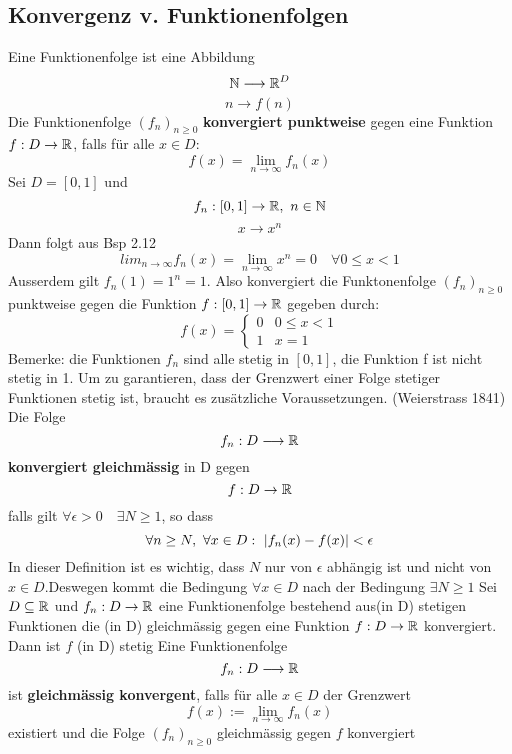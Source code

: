 \subsection{Konvergenz v. Funktionenfolgen}
Eine Funktionenfolge ist eine Abbildung 
\[ \mathbb{N} \longrightarrow \mathbb{R}^D\]
\[ n \longrightarrow f(n)\]
\Def[3.30] Die Funktionenfolge \((f_n)_{n \geq 0}\) \textbf{konvergiert punktweise} gegen eine Funktion \(f: D \rightarrow \mathbb{R}\), falls für alle \(x \in D :\)
\[f(x) = \lim\limits_{n \rightarrow \infty}f_n(x)\]
\Bsp[3.31] Sei \( D = [0,1]\) und
\[ f_n: [0,1] \rightarrow \mathbb{R}, \ n \in \mathbb{N}\]
\[ x \rightarrow x^n\]
Dann folgt aus Bsp 2.12
\[ lim_{n \rightarrow \infty} f_n(x) = \lim_{n \rightarrow \infty} x^n = 0 \quad \forall 0 \leq x < 1\]
Ausserdem gilt \( f_n(1) = 1^n = 1\). Also konvergiert die Funktonenfolge \( (f_n)_{n \geq 0}\) punktweise gegen die Funktion \( f:[0,1] \rightarrow \mathbb{R}\) gegeben durch:
\begin{equation}
f(x)=\left\{\begin{array}{lc}
0 & 0 \leq x<1 \\
1 & x=1
\end{array}\right.
\end{equation}
Bemerke: die Funktionen \(f_n\) sind alle stetig in \([0,1]\), die Funktion f ist nicht stetig in 1.
Um zu garantieren, dass der Grenzwert einer Folge stetiger Funktionen stetig ist, braucht es zusätzliche Voraussetzungen. \newline
\Def[3.32] (Weierstrass 1841) Die Folge
\[f_n : D \longrightarrow \mathbb{R} \]
\textbf{konvergiert gleichmässig} in D gegen
\[f : D  \rightarrow \mathbb{R}\]
falls gilt \( \forall \epsilon > 0 \quad \exists N \geq 1\), so dass
\[\forall n \geq N,\  \forall x \in D :\  \left\lvert f_n(x) - f(x)  \right\rvert < \epsilon \] \newline
In dieser Definition ist es wichtig, dass \(N\) nur von \( \epsilon\) abhängig ist und nicht von \(x \in D\).Deswegen kommt die Bedingung \(\forall x \in D\) nach der Bedingung \(\exists N \geq 1\)
\Satz[3.33] Sei \(D \subseteq \mathbb{R}\) und \(f_n : D \rightarrow \mathbb{R} \) eine Funktionenfolge bestehend aus(in D) stetigen Funktionen die (in D) gleichmässig gegen eine Funktion \(f: D \rightarrow \mathbb{R} \) konvergiert. Dann ist \(f\) (in D) stetig \newline
\Def[3.34] Eine Funktionenfolge
\[f_n : D \longrightarrow \mathbb{R}\]
ist \textbf{gleichmässig konvergent}, falls für alle \(x \in D\) der Grenzwert
\[f(x) := \lim\limits_{n \rightarrow \infty} f_n(x)\]
existiert und die Folge \((f_n)_{n \geq 0}\) gleichmässig gegen \(f\) konvergiert \newline
